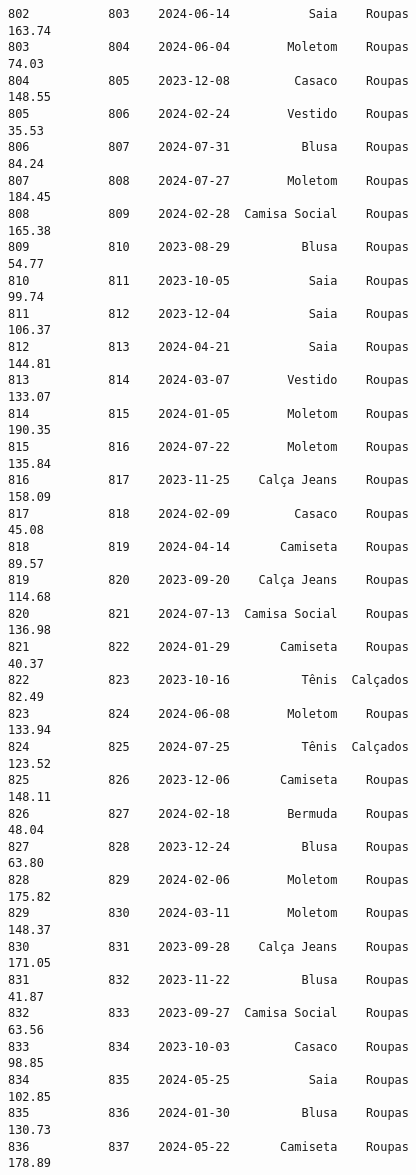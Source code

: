 \documentclass[11pt]{article}
\begin{document}
\begin{Verbatim}[commandchars=\\\{\}]
802           803    2024-06-14           Saia    Roupas          163.74   
803           804    2024-06-04        Moletom    Roupas           74.03   
804           805    2023-12-08         Casaco    Roupas          148.55   
805           806    2024-02-24        Vestido    Roupas           35.53   
806           807    2024-07-31          Blusa    Roupas           84.24   
807           808    2024-07-27        Moletom    Roupas          184.45   
808           809    2024-02-28  Camisa Social    Roupas          165.38   
809           810    2023-08-29          Blusa    Roupas           54.77   
810           811    2023-10-05           Saia    Roupas           99.74   
811           812    2023-12-04           Saia    Roupas          106.37   
812           813    2024-04-21           Saia    Roupas          144.81   
813           814    2024-03-07        Vestido    Roupas          133.07   
814           815    2024-01-05        Moletom    Roupas          190.35   
815           816    2024-07-22        Moletom    Roupas          135.84   
816           817    2023-11-25    Calça Jeans    Roupas          158.09   
817           818    2024-02-09         Casaco    Roupas           45.08   
818           819    2024-04-14       Camiseta    Roupas           89.57   
819           820    2023-09-20    Calça Jeans    Roupas          114.68   
820           821    2024-07-13  Camisa Social    Roupas          136.98   
821           822    2024-01-29       Camiseta    Roupas           40.37   
822           823    2023-10-16          Tênis  Calçados           82.49   
823           824    2024-06-08        Moletom    Roupas          133.94   
824           825    2024-07-25          Tênis  Calçados          123.52   
825           826    2023-12-06       Camiseta    Roupas          148.11   
826           827    2024-02-18        Bermuda    Roupas           48.04   
827           828    2023-12-24          Blusa    Roupas           63.80   
828           829    2024-02-06        Moletom    Roupas          175.82   
829           830    2024-03-11        Moletom    Roupas          148.37   
830           831    2023-09-28    Calça Jeans    Roupas          171.05   
831           832    2023-11-22          Blusa    Roupas           41.87   
832           833    2023-09-27  Camisa Social    Roupas           63.56   
833           834    2023-10-03         Casaco    Roupas           98.85   
834           835    2024-05-25           Saia    Roupas          102.85   
835           836    2024-01-30          Blusa    Roupas          130.73   
836           837    2024-05-22       Camiseta    Roupas          178.89   

\end{Verbatim}
\end{document}
